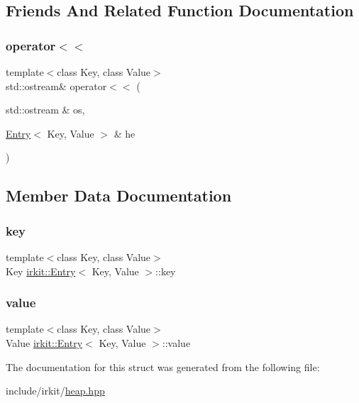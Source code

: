 \subsection{Friends And Related Function Documentation}
\mbox{\label{structirkit_1_1Entry_a885f1645de32df3dbfbf9f2f47f7ea1f}} 
\subsubsection{\texorpdfstring{operator$<$$<$}{operator<<}}
{\footnotesize\ttfamily template$<$class Key, class Value$>$ \\
std\+::ostream\& operator$<$$<$ (\begin{DoxyParamCaption}\item[{std\+::ostream \&}]{os,  }\item[{\hyperlink{structirkit_1_1Entry}{Entry}$<$ Key, Value $>$ \&}]{he }\end{DoxyParamCaption})\hspace{0.3cm}{\ttfamily [friend]}}



\subsection{Member Data Documentation}
\mbox{\label{structirkit_1_1Entry_aeae4387483b4905afd7dfd71df9104fc}} 
\subsubsection{\texorpdfstring{key}{key}}
{\footnotesize\ttfamily template$<$class Key, class Value$>$ \\
Key \hyperlink{structirkit_1_1Entry}{irkit\+::\+Entry}$<$ Key, Value $>$\+::key}

\mbox{\label{structirkit_1_1Entry_a72e5dd8efe13d360f7b97c37d05b99b8}} 
\subsubsection{\texorpdfstring{value}{value}}
{\footnotesize\ttfamily template$<$class Key, class Value$>$ \\
Value \hyperlink{structirkit_1_1Entry}{irkit\+::\+Entry}$<$ Key, Value $>$\+::value}



The documentation for this struct was generated from the following file\+:\begin{DoxyCompactItemize}
\item 
include/irkit/\hyperlink{heap_8hpp}{heap.\+hpp}\end{DoxyCompactItemize}
